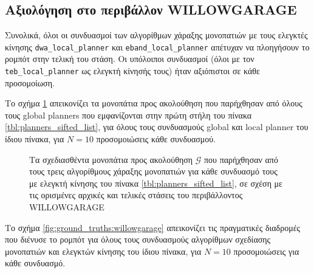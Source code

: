 \subsection{Αξιολόγηση στο περιβάλλον WILLOWGARAGE}
  \label{subsection:02_01_04:03}

Συνολικά, όλοι οι συνδυασμοί των αλγορίθμων χάραξης μονοπατιών με τους
ελεγκτές κίνησης \texttt{dwa\_local\_planner} και \texttt{eband\_local\_planner}
απέτυχαν να πλοηγήσουν το ρομπότ στην τελική του στάση. Οι υπόλοιποι συνδυασμοί
(όλοι με τον \texttt{teb\_local\_planner} ως ελεγκτή κίνησής τους) ήταν
αξιόπιστοι σε κάθε προσομοίωση.

Το σχήμα \ref{fig:global_plans:willowgarage} απεικονίζει τα μονοπάτια προς
ακολούθηση που παρήχθησαν από όλους τους global planners που εμφανίζονται στην
πρώτη στήλη του πίνακα \ref{tbl:planners_sifted_list}, για όλους τους
συνδυασμούς global και local planner του ίδιου πίνακα, για $N=10$ προσομοιώσεις
κάθε συνδυασμού.

\begin{figure}
\raggedright
  \begin{subfigure}[t]{\linewidth}
    \centering
    
  \end{subfigure}%
  \vspace{-1.5cm}
  \begin{subfigure}[t]{\linewidth}
    \centering
    
  \end{subfigure}%
  \vspace{-1.5cm}
  \begin{subfigure}[t]{\linewidth}
    \centering
    
  \end{subfigure}%
  \caption{\small Τα σχεδιασθέντα μονοπάτια προς ακολούθηση $\bm{\mathcal{G}}$
           που παρήχθησαν από τους τρεις αλγορίθμους χάραξης μονοπατιών για
           κάθε συνδυασμό τους με ελεγκτή κίνησης του πίνακα
           \ref{tbl:planners_sifted_list}, σε σχέση με τις ορισμένες αρχικές και
           τελικές στάσεις του περιβάλλοντος WILLOWGARAGE}
  \label{fig:global_plans:willowgarage}
\end{figure}

Το σχήμα \ref{fig:ground_truths:willowgarage} απεικονίζει τις πραγματικές
διαδρομές που διένυσε το ρομπότ για όλους τους συνδυασμούς αλγορίθμων σχεδίασης
μονοπατιών και ελεγκτών κίνησης του ίδιου πίνακα, για $N=10$ προσομοιώσεις για
κάθε συνδυασμό.

